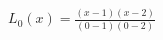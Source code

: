 \documentclass[preview]{standalone}
\begin{document}
\begin{align*}
L_0(x) = \frac{(x - 1)(x - 2)}{(0 - 1)(0 - 2)}
\end{align*}
\end{document}
